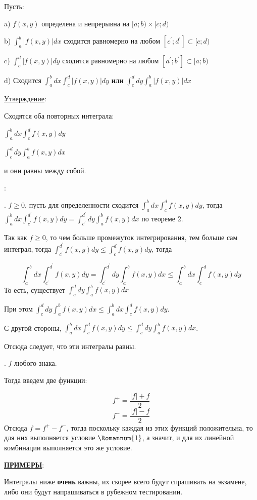 \documentclass[12pt]{article}
\begin{document}
Пусть:\par
a) $f(x,y)$ определена и непрерывна на $[a;b) \times [c;d)$\par
b) $\int_a^b |f(x,y) |dx$ сходится равномерно на любом $[c^{'};d^{'}] \subset [c;d)$\par
c) $\int_c^d |f(x,y) |dy$ сходится равномерно на любом $[a^{'};b^{'}] \subset [a;b)$\par 
d) Сходится $\int_a^b dx \int_c^d |f(x,y)|dy$ \textbf{или} $\int_c^d dy \int_a^b |f(x,y)|dx$\par
\uline{Утверждение}:\par
Сходятся оба повторных интеграла:\par
\indent $\int_a^b dx \int_c^d f(x,y) dy$\par
\indent $\int_c^d dy \int_a^b f(x,y) dx$\par
и они равны между собой.\par
{}:\par
{}. $f \geq 0$, пусть для определенности сходится $\int_a^b dx \int_c^d f(x,y) dy$, тогда $\int_a^b dx \int_{c^{'}}^{d^{'}} f(x,y) dy = \int_{c^{'}}^{d^{'}} dy \int_a^b f(x,y) dx$ по теореме 2.\par
Так как $f \geq 0$, то чем больше промежуток интегрирования, тем больше сам интеграл, тогда $\int_{c^{'}}^{d^{'}} f(x,y) dy \leq \int_c^d f(x,y) dy$, тогда\par
$$\int_a^b dx \int_{c^{'}}^{d^{'}} f(x,y) dy = \int_{c^{'}}^{d^{'}} dy \int_a^b f(x,y) dx \leq \int_a^b dx \int_c^d f(x,y) dy$$
То есть, существует $\int_c^d dy \int_a^b f(x,y) dx$\par
При этом $\int_c^d dy \int_a^b f(x,y) dx \leq \int_a^b dx \int_c^d f(x,y) dy$.\par
С другой стороны, $\int_a^b dx \int_c^d f(x,y) dy \leq \int_c^d dy \int_a^b f(x,y) dx$.\par
Отсюда следует, что эти интегралы равны.\par
{}. $f$ любого знака.\par
Тогда введем две функции:\par
$$f^{+} = \frac{|f| + f}{2}$$
$$f^{-} = \frac{|f| - f}{2}$$
Отсюда $f = f^{+} - f^{-}$, тогда поскольку каждая из этих функций положительна, то для них выполняется условие $\Romannum{1}$, а значит, и для их линейной комбинации выполняется это же условие.\par
\uline{\textbf{ПРИМЕРЫ}}:\par
Интегралы ниже \textbf{очень} важны, их скорее всего будут спрашивать на экзамене, либо они будут напрашиваться в рубежном тестировании.\par
\end{document}
